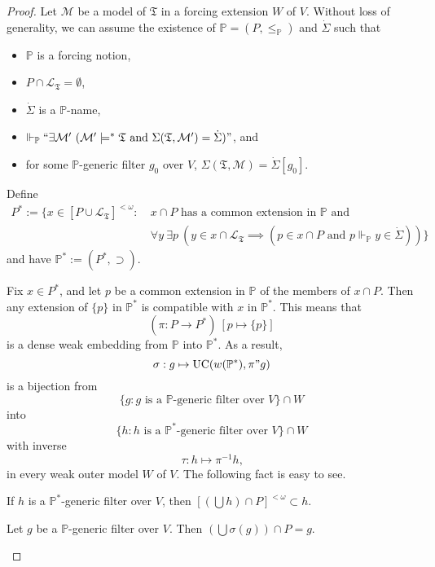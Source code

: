 \documentclass[12pt]{article}
\numberwithin{equation}{section}
\begin{document}
\begin{proof}
Let $\mathcal{M}$ be a model of $\mathfrak{T}$ in a forcing extension $W$ of $V$. Without loss of generality, we can assume the existence of $\mathbb{P} = (P, \leq_{\mathbb{P}})$ and $\dot{\Sigma}$ such that
\begin{itemize}
    \item $\mathbb{P}$ is a forcing notion,
    \item $P \cap \mathcal{L}_{\mathfrak{T}} = \emptyset$,
    \item $\dot{\Sigma}$ is a $\mathbb{P}$-name, 
    \item $\Vdash_{\mathbb{P}} ``\exists \mathcal{M}' \ (\mathcal{M}' \models^* \mathfrak{T} \text{ and } \Sigma(\mathfrak{T}, \mathcal{M}') = \dot{\Sigma})"$, and
    \item for some $\mathbb{P}$-generic filter $g_0$ over $V$, $\Sigma(\mathfrak{T}, \mathcal{M}) = \dot{\Sigma}[g_0]$.
\end{itemize}
Define
\begin{align*}
    P^* := \{x \in [P \cup \mathcal{L}_{\mathfrak{T}}]^{< \omega} : \ & x \cap P \text{ has a common extension in } \mathbb{P} \text{ and} \\ 
    & \forall y \ \exists p \ (y \in x \cap \mathcal{L}_{\mathfrak{T}} \implies (p \in x \cap P \text{ and } p \Vdash_{\mathbb{P}} y \in \dot{\Sigma}))\}
\end{align*}
and have $\mathbb{P}^* := (P^*, \supset)$.

Fix $x \in P^*$, and let $p$ be a common extension in $\mathbb{P}$ of the members of $x \cap P$. Then any extension of $\{p\}$ in $\mathbb{P}^*$ is compatible with $x$ in $\mathbb{P}^*$. This means that $$(\pi : P \longrightarrow P^*) \ [p \mapsto \{p\}]$$ is a dense weak embedding from $\mathbb{P}$ into $\mathbb{P}^*$. As a result, $$\sigma : g \mapsto \mathrm{UC}(w(\mathbb{P}^*), \pi" g)$$ is a bijection from $$\{g : g \text{ is a } \mathbb{P} \text{-generic filter over } V\} \cap W$$ into $$\{h : h \text{ is a } \mathbb{P}^* \text{-generic filter over } V\} \cap W$$ with inverse $$\tau : h \mapsto \pi^{-1} h \text{,}$$ in every weak outer model $W$ of $V$. The following fact is easy to see.

\begin{fact}\label{cufs}
If $h$ is a $\mathbb{P}^*$-generic filter over $V$, then $[(\bigcup h) \cap P]^{< \omega} \subset h$.
\end{fact}

\begin{prop}\label{p524}
Let $g$ be a $\mathbb{P}$-generic filter over $V$. Then $(\bigcup \sigma(g)) \cap P = g$.
\end{prop}


\end{proof}
\end{document}
